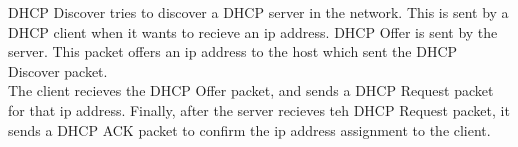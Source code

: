 DHCP Discover tries to discover a DHCP server in the network. This is sent by a DHCP client when it wants to recieve an ip address. DHCP Offer is sent by the server. This packet offers an ip address to the host which sent the DHCP Discover packet. \\
The client recieves the DHCP Offer packet, and sends a DHCP Request packet for that ip address. Finally, after the server recieves teh DHCP Request packet, it sends a DHCP ACK packet to confirm the ip address assignment to the client.
